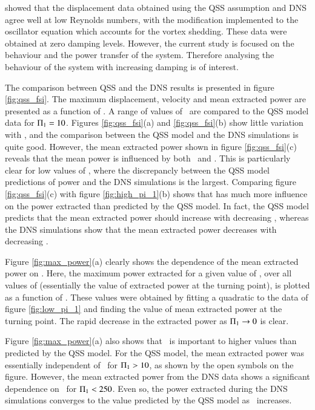 \citet{Joly2012} showed that the displacement data obtained using the QSS assumption and DNS agree well at low Reynolds numbers, with the modification implemented to the oscillator equation which accounts for the vortex shedding. These data were obtained at zero damping levels. However, the current study is focused on the behaviour and the power transfer of the system. Therefore analysing the behaviour of the system with increasing damping is of interest.

The comparison between QSS and the DNS results is presented in figure \ref{fig:qss_fsi}. The maximum displacement, velocity and mean extracted power are presented as a function of \massdamp. A range of values of \massstiff\ are compared to the QSS model data for $\Pi_1 = 10$. Figures \ref{fig:qss_fsi}(a) and \ref{fig:qss_fsi}(b) show little variation with \massstiff, and the comparison between the QSS model and the DNS simulations is quite good. However, the mean extracted power shown in figure \ref{fig:qss_fsi}(c) reveals that the mean power is influenced by both \massstiff\ and \massdamp. This is particularly clear for low values of \massstiff, where the discrepancly between the QSS model predictions of power and the DNS simulations is the largest. Comparing figure \ref{fig:qss_fsi}(c) with figure \ref{fig:high_pi_1}(b) shows that \massstiff has much more influence on the power extracted than predicted by the QSS model. In fact, the QSS model predicts that the mean extracted power should increase with decreasing \massstiff, whereas the DNS simulations show that the mean extracted power decreases with decreasing \massstiff.



Figure \ref{fig:max_power}(a) clearly shows the dependence of the mean extracted power on \massstiff. Here, the maximum power extracted for a given value of \massstiff, over all values of \massdamp (essentially the value of extracted power at the turning point), is plotted as a function of \massstiff. These values were obtained by fitting a quadratic to the data of figure \ref{fig:low_pi_1} and finding the value of mean extracted power at the turning point. The rapid decrease in the extracted power as $\Pi_1 \rightarrow 0$ is clear.



Figure \ref{fig:max_power}(a) also shows that \massstiff\ is important to higher values than predicted by the QSS model. For the QSS model, the mean extracted power was essentially independent of \massstiff\ for $\Pi_1>10$, as shown by the open symbols on the figure. However, the mean extracted power from the DNS data shows a significant dependence on \massstiff\ for $\Pi_1<250$. Even so, the power extracted during the DNS simulations converges to the value predicted by the QSS model as \massstiff\ increases.

